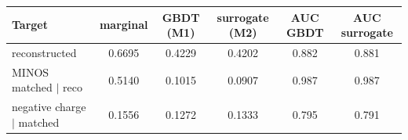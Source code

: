 \begin{tabular}{lccccc}
\toprule
Target & marginal & GBDT (M1) & surrogate (M2) & AUC GBDT & AUC surrogate \\
\midrule
reconstructed & 0.6695 & 0.4229 & 0.4202 & 0.882 & 0.881 \\
MINOS matched $\mid$ reco & 0.5140 & 0.1015 & 0.0907 & 0.987 & 0.987 \\
negative charge $\mid$ matched & 0.1556 & 0.1272 & 0.1333 & 0.795 & 0.791 \\
\bottomrule
\end{tabular}
